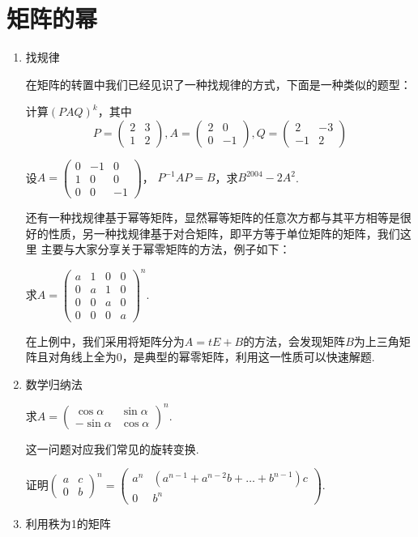 \section{矩阵的幂}
\begin{enumerate}
	\item 找规律
	
	在矩阵的转置中我们已经见识了一种找规律的方式，下面是一种类似的题型：
	\begin{example}
		计算$(PAQ)^k$，其中
		$$P=\begin{pmatrix}2 & 3 \\ 1 & 2\end{pmatrix}, A=\begin{pmatrix}2 & 0 \\ 0 & -1\end{pmatrix}, Q=\begin{pmatrix}2 & -3 \\ -1 & 2\end{pmatrix}$$
	\end{example}
	
	\begin{example}
		设$A=\begin{pmatrix}0 & -1 & 0 \\ 1 & 0 & 0 \\ 0 & 0 & -1 \end{pmatrix}$，
		$P^{-1}AP=B$，求$B^{2004}-2A^2$.
	\end{example}

	还有一种找规律基于幂等矩阵，显然幂等矩阵的任意次方都与其平方相等是很好的性质，另一种找规律基于对合矩阵，即平方等于单位矩阵的矩阵，我们这里
	主要与大家分享关于幂零矩阵的方法，例子如下：
	\begin{example}
		求$A=\begin{pmatrix}a & 1 & 0 & 0 \\ 0 & a & 1 & 0 \\ 0 & 0 & a & 0 \\ 0 & 0 & 0 & a \end{pmatrix}^n$.
	\end{example}
	在上例中，我们采用将矩阵分为$A=tE+B$的方法，会发现矩阵$B$为上三角矩阵且对角线上全为0，是典型的幂零矩阵，利用这一性质可以快速解题.
	\item 数学归纳法
	\begin{example}
		求$A=\begin{pmatrix}\cos\alpha & \sin\alpha \\ -\sin\alpha & \cos\alpha\end{pmatrix}^n$.
	\end{example}
	这一问题对应我们常见的旋转变换.
	\begin{example}
		证明$\begin{pmatrix}
			a & c \\ 0 & b
		\end{pmatrix}^n=\begin{pmatrix}
			a^n & (a^{n-1}+a^{n-2}b+\dots+b^{n-1})c \\ 0 & b^n
		\end{pmatrix}$.
	\end{example}
	\item 利用秩为1的矩阵
	

\end{enumerate}
